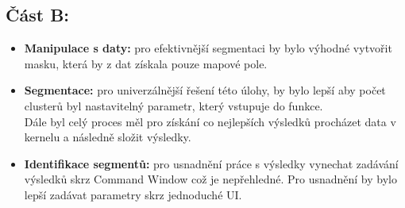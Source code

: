 \subsection*{Část B:}
\begin{itemize}
    \item \textbf{Manipulace s daty:} pro efektivnější segmentaci by bylo výhodné vytvořit masku, která by z dat získala pouze mapové pole.
    \item \textbf{Segmentace:} pro univerzálnější řešení této úlohy, by bylo lepší aby počet clusterů byl nastavitelný parametr, který vstupuje do funkce.\\
    Dále byl celý proces měl pro získání co nejlepších výsledků procházet data v kernelu a následně složit výsledky.
    \item \textbf{Identifikace segmentů:} pro usnadnění práce s výsledky vynechat zadávání výsledků skrz Command Window což je nepřehledné. Pro usnadnění by bylo lepší zadávat parametry skrz jednoduché UI.
\end{itemize}